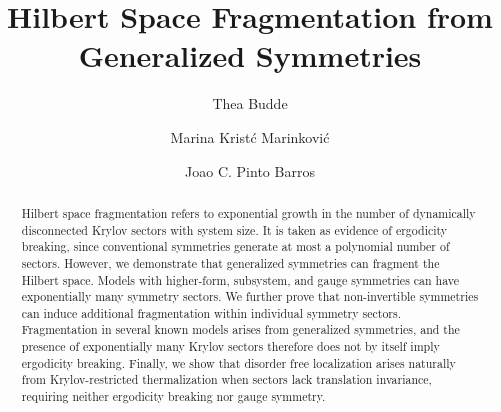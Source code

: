 \documentclass[
 reprint,
 amsmath,amssymb,
 aps,floatfix,prl,superscriptaddress
]{revtex4-2}
\begin{document}
\title{Hilbert Space Fragmentation from Generalized Symmetries}
\author{Thea Budde}
\author{Marina Krist\'{c} Marinkovi\'{c}}
\author{Joao C. Pinto Barros}

\begin{abstract}
    Hilbert space fragmentation refers to exponential growth in the number of dynamically disconnected Krylov sectors with system size. It is taken as evidence of ergodicity breaking, since conventional symmetries generate at most a polynomial number of sectors. However, we demonstrate that generalized symmetries can fragment the Hilbert space. Models with higher-form, subsystem, and gauge symmetries can have exponentially many symmetry sectors. We further prove that non-invertible symmetries can induce additional fragmentation within individual symmetry sectors. Fragmentation in several known models arises from generalized symmetries, and the presence of exponentially many Krylov sectors therefore does not by itself imply ergodicity breaking. Finally, we show that disorder free localization arises naturally from Krylov-restricted thermalization when sectors lack translation invariance, requiring neither ergodicity breaking nor gauge symmetry.
\end{abstract}

\maketitle
\end{document}
